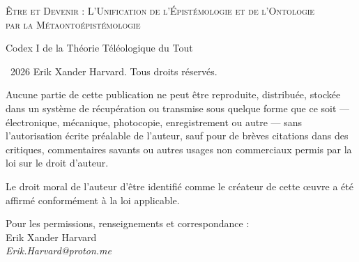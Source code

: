 \documentclass[10pt, openany, oneside]{book}
\renewcommand{\small}{\fontsize{9}{11.5}\selectfont}
\begin{document}

\thispagestyle{empty}
\vspace*{\fill}

\begin{center}

{\scshape Être et Devenir : L'Unification de l'Épistémologie et de l'Ontologie\\par la Métaontoépistémologie}

\vspace{1em}

{\small Codex I de la Théorie Téléologique du Tout}

\end{center}

\vspace{1.5em}

{\small
\noindent \textcopyright\ 2026 Erik Xander Harvard. Tous droits réservés.

\vspace{0.8em}

\noindent Aucune partie de cette publication ne peut être reproduite, distribuée, stockée dans un système de récupération ou transmise sous quelque forme que ce soit --- électronique, mécanique, photocopie, enregistrement ou autre --- sans l'autorisation écrite préalable de l'auteur, sauf pour de brèves citations dans des critiques, commentaires savants ou autres usages non commerciaux permis par la loi sur le droit d'auteur.

\vspace{0.8em}

\noindent Le droit moral de l'auteur d'être identifié comme le créateur de cette œuvre a été affirmé conformément à la loi applicable.

\vspace{0.8em}

\noindent Pour les permissions, renseignements et correspondance :\\
Erik Xander Harvard\\
\textit{Erik.Harvard@proton.me}
}

\vspace{1.5em}
\end{document}
